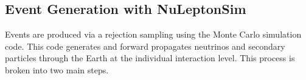 




\subsection{Event Generation with NuLeptonSim \label{sec:eventLists}} 
  
      Events are produced via a rejection sampling using the \nuleptonsim{} Monte Carlo simulation code.
      This code generates and forward propagates neutrinos and secondary particles through the Earth at the individual interaction level.
      This process is broken into two main steps.


